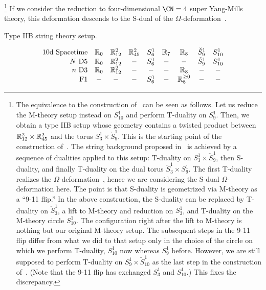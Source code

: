 \footnote{The equivalence to the construction
  of~\cite{Costello:2018txb} can be seen as follows.  Let us reduce
  the M-theory setup instead on $S^1_{10}$ and perform T-duality on
  $S^1_9$.  Then, we obtain a type IIB setup whose geometry contains a
  twisted product between $\mathbb{R}^2_{12} \times \mathbb{R}^2_{45}$ and the torus
  $S^1_3 \times \check S^1_9$.  This is the starting point of the
  construction of~\cite{Costello:2018txb}.  The string background
  proposed in~\cite{Costello:2018txb} is achieved by a sequence of
  dualities applied to this setup: T-duality on
  $S^1_3 \times \check S^1_9$, then S-duality, and finally T-duality
  on the dual torus $\check S^1_3 \times S^1_9$.  The first T-duality
  realizes the $\Omega$-deformation~\cite{Hellerman:2011mv}, hence we
  are considering the S-dual $\Omega$-deformation here.  The point is
  that S-duality is geometrized via M-theory as a ``9-11 flip.''  In
  the above construction, the S-duality can be replaced by T-duality
  on $\check S^1_3$, a lift to M-theory and reduction on $S^1_3$, and
  T-duality on the M-theory circle $S^1_{10}$.  The configuration
  right after the lift to M-theory is nothing but our original
  M-theory setup.  The subsequent steps in the 9-11 flip differ from
  what we did to that setup only in the choice of the circle on which
  we perform T-duality, $S^1_{10}$ now whereas $S^1_9$ before.
  However, we are still supposed to perform T-duality on
  $S^1_9 \times \check S^1_{10}$ as the last step in the construction
  of~\cite{Costello:2018txb}.  (Note that the 9-11 flip has exchanged
  $S^1_3$ and $S^1_{10}$.)  This fixes the discrepancy.}
%
If we consider the reduction to four-dimensional $\CN = 4$ super
Yang-Mills theory, this deformation descends to the S-dual of the
$\Omega$-deformation~\cite{Nekrasov:2002qd}.


\begin{table}
  \caption{Type IIB string theory setup.}
  \vspace{-0.5cm}
    \centering
    \begin{equation*}
      \begin{array}{rcccccccc}
        \text{10d Spacetime} & \mathbb{R}_0 & \mathbb{R}_{12}^2  & \mathbb{R}_{45}^2 & S_6^1 & \mathbb{R}_{7} & \mathbb{R}_{8} & \check{S}^1_9 & S_{10}^1 \\
        N \text{ D5}         & \mathbb{R}_0 & \mathbb{R}_{12}^2  & - & S_6^1 & - & - & \check{S}^1_9 & S_{10}^1 \\
        n \text{ D3}         & \mathbb{R}_0 & \mathbb{R}_{12}^2  & - & - & - & \mathbb{R}_8 & - & - \\
        \text{F1}            & - & -  & - & S_6^1 & - & \mathbb{R}_8^{\geq 0} & - & -
      \end{array}
    \end{equation*}
\label{tab:IIB-branes}
\end{table}



